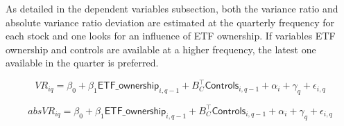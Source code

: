 As detailed in the dependent variables subsection, both the variance ratio and absolute variance ratio deviation are estimated at the quarterly frequency for each stock and one looks for an influence of ETF ownership. If variables ETF ownership and controls are available at a higher frequency, the latest one available in the quarter is preferred.

\begin{equation}
  VR_{iq} = \beta_{0} + \beta_{1} \mathsf{ETF\_ownership}_{i, q - 1} + B_{C}^{\intercal} \mathsf{Controls}_{i, q - 1} + \alpha_{i} + \gamma_{q} + \epsilon_{i, q}
\end{equation}

\begin{equation}
 absVR_{iq} = \beta_{0} + \beta_{1} \mathsf{ETF\_ownership}_{i, q - 1} + B_{C}^{\intercal} \mathsf{Controls}_{i, q - 1} + \alpha_{i} + \gamma_{q} + \epsilon_{i, q}
\end{equation}
